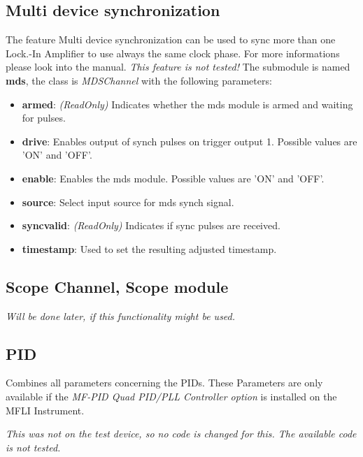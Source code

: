 \documentclass[11pt]{article} %
\begin{document}
\subsection{Multi device synchronization}
The feature Multi device synchronization can be used to sync more than one Lock.-In Amplifier to use always the same clock phase. For more informations please look into the manual. {\it This feature is not tested!} The submodule is named {\bf mds}, the class is {\it MDSChannel} with the following parameters:
\begin{itemize}
\item {\bf armed}: {\it (ReadOnly)} Indicates whether the mds module is armed and waiting for pulses.
\item {\bf drive}: Enables output of synch pulses on trigger output 1. Possible values are 'ON' and 'OFF'.
\item {\bf enable}: Enables the mds module. Possible values are 'ON' and 'OFF'.
\item {\bf source}: Select input source for mds synch signal.
\item {\bf syncvalid}: {\it (ReadOnly)} Indicates if sync pulses are received.
\item {\bf timestamp}: Used to set the resulting adjusted timestamp.
\end{itemize}


\subsection{Scope Channel, Scope module}
        {\it Will be done later, if this functionality might be used.}


\subsection{PID}
Combines all parameters concerning the PIDs. These Parameters are only available if the {\it MF-PID Quad PID/PLL Controller option} is installed on the MFLI Instrument.

{\it This was not on the test device, so no code is changed for this. The available code is not tested.}
\end{document}
